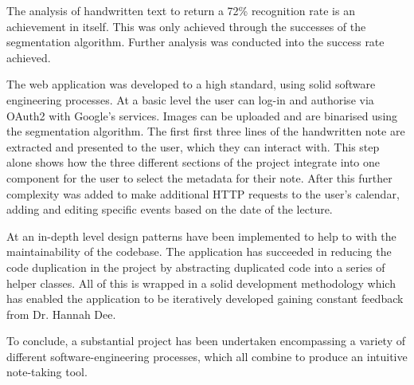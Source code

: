 The analysis of handwritten text to return a 72\% recognition rate is an achievement in itself. This was only achieved through the successes of the segmentation algorithm. Further analysis was conducted into the success rate achieved.

The web application was developed to a high standard, using solid software engineering processes. At a basic level the user can log-in and authorise via OAuth2 with Google's services. Images can be uploaded and  are binarised using the segmentation algorithm. The first first three lines of the handwritten note are extracted and presented to the user, which they can interact with. This step alone shows how the three different sections of the project integrate into one component for the user to select the metadata for their note. After this further complexity was added to make additional HTTP requests to the user's calendar, adding and editing specific events based on the date of the lecture.

At an in-depth level design patterns have been implemented to help to with the maintainability of the codebase. The application has succeeded in reducing the code duplication in the project by abstracting duplicated code into a series of helper classes. All of this is wrapped in a solid development methodology which has enabled the application to be iteratively developed gaining constant feedback from Dr. Hannah Dee.

To conclude, a substantial project has been undertaken encompassing a variety of different software-engineering processes, which all combine to produce an intuitive note-taking tool.
